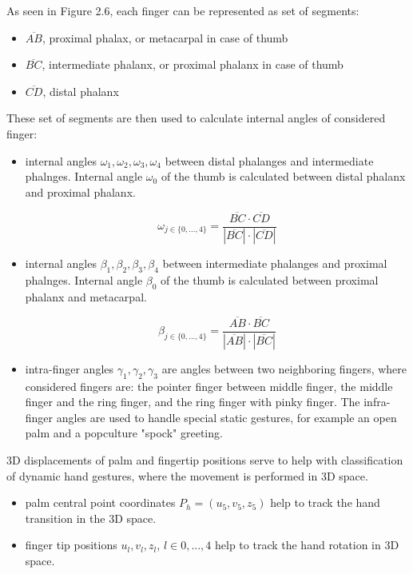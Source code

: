 As seen in Figure 2.6, each finger can be represented as set of segments:
\begin{itemize}
	\item $\overline{AB}$, proximal phalax, or metacarpal in case of thumb
	\item $\overline{BC}$, intermediate phalanx, or proximal phalanx in case of thumb
	\item $\overline{CD}$, distal phalanx
\end{itemize}

These set of segments are then used to calculate internal angles of considered finger:
\begin{itemize}
	\item internal angles $\omega_1, \omega_2, \omega_3, \omega_4$ between distal phalanges and intermediate phalnges. Internal angle $\omega_0$ of the thumb is calculated between distal phalanx and proximal phalanx.
	
	\begin{equation}
		{\omega_{j \in \{0, ..., 4\}} = \frac{\overline{BC} \cdot \overline{CD}}{|\overline{BC}| \cdot |\overline{CD}|}}
	\end{equation}

	\item internal angles $\beta_1, \beta_2, \beta_3, \beta_4$ between intermediate phalanges and proximal phalnges. Internal angle $\beta_0$ of the thumb is calculated between proximal phalanx and metacarpal.
	
	\begin{equation}
		{\beta_{j \in \{0, ..., 4\}} = \frac{\overline{AB} \cdot \overline{BC}}{|\overline{AB}| \cdot |\overline{BC}|}}
	\end{equation}
	
	\item intra-finger angles $\gamma_1, \gamma_2, \gamma_3$ are angles between two neighboring fingers, where considered fingers are: the pointer finger between middle finger, the middle finger and the ring finger, and the ring finger with pinky finger. The infra-finger angles are used to handle special static gestures,  for example an open palm and a popculture "spock" greeting.
\end{itemize}

3D displacements of palm and fingertip positions serve to help with classification of dynamic hand gestures, where the movement is performed in 3D space.

\begin{itemize}
	\item palm central point coordinates $P_h = (u_5, v_5, z_5)$ help to track the hand transition in the 3D space.
	\item finger tip positions $u_l, v_l, z_l$, $l \in {0, ..., 4}$ help to track the hand rotation in 3D space.
\end{itemize}

